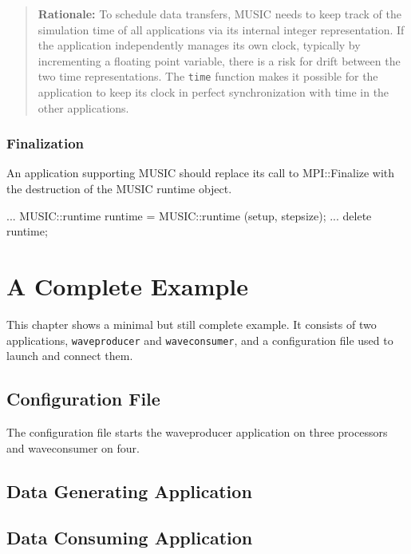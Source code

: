 \documentclass[a4paper]{report}
\newenvironment{rationale}%
{\par\begin{quote}\textbf{Rationale:}}%
{\par\end{quote}}
\begin{document}
\begin{rationale}
  To schedule data transfers, MUSIC needs to keep track of the
  simulation time of all applications via its internal integer
  representation.  If the application independently manages its own
  clock, typically by incrementing a floating point variable, there is
  a risk for drift between the two time representations.  The
  \lstinline|time| function makes it possible for the application to
  keep its clock in perfect synchronization with time in the other
  applications.
\end{rationale}


\subsection{Finalization}

An application supporting MUSIC should replace its call to
MPI::Finalize with the destruction of the MUSIC runtime object.

\begin{code}{}
  ...
  MUSIC::runtime runtime = MUSIC::runtime (setup, stepsize);
  ...
  delete runtime;
\end{code}

\chapter{A Complete Example}

This chapter shows a minimal but still complete example.  It consists
of two applications, \texttt{waveproducer} and \texttt{waveconsumer},
and a configuration file used to launch and connect them.


\section{Configuration File}
\label{sec:conffile}

The configuration file starts the waveproducer application on three
processors and waveconsumer on four.




\section{Data Generating Application}




\section{Data Consuming Application}
\end{document}
